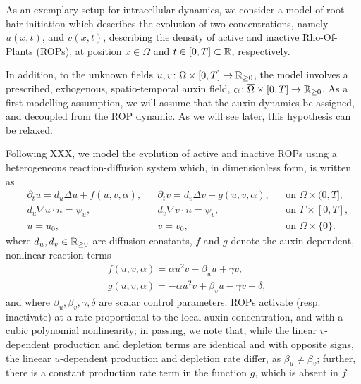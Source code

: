 \documentclass[a4paper]{siamonline220329}
\begin{document}
As an exemplary setup for intracellular dynamics, we consider a model of root-hair
initiation which describes the evolution of two concentrations, namely $u(x,t)$, and
$v(x,t)$, describing the density of active and inactive Rho-Of-Plants (ROPs), at
position $x \in \Omega$ and $t \in [0,T] \subset \mathbb{R}$, respectively.  

In addition, to the unknown fields $u,v \colon \overline{\Omega} \times [0,T] \to
\mathbb{R}_{ \geq  0}$, the model involves a prescribed, exhogenous, spatio-temporal auxin
field, $\alpha \colon \overline{\Omega} \times [0,T] \to \mathbb{R}_{ \geq  0}$. As a
first modelling assumption, we will assume that the auxin dynamics be assigned, and
decoupled from the ROP dynamic. As we will see later, this hypothesis can be relaxed.

Following XXX, we model the evolution of active and inactive ROPs using a
heterogeneous reaction-diffusion system which, in dimensionless form, is written
as
  \begin{align}
    & \partial_t u = d_u \Delta u + f(u,v,\alpha), 
      && \partial_t v = d_v \Delta v + g(u,v,\alpha), 
      && \text{on $\Omega\times (0,T]$,} \label{eq:RDEs}\\
    & d_u \nabla u \cdot n = \psi_u, 
      && d_v \nabla v \cdot n = \psi_v, 
      && \text{on $\Gamma \times [0,T]$,} \label{eq:BCs}\\
    & u = u_0,  && v = v_0, && \text{on $\Omega \times \{0\}$.} \label{eq:ICs}
  \end{align}
where $d_u, d_v \in \mathbb{R}_{ \geq 0}$ are diffusion constants, $f$ and $g$  denote the auxin-dependent, nonlinear
reaction terms
\[
  \begin{aligned}
   & f(u,v,\alpha) = \alpha u^2 v - \beta_u u + \gamma v, \\
   & g(u,v,\alpha) = -\alpha u^2 v + \beta_v u - \gamma v + \delta,
  \end{aligned}
\]
and where $\beta_u, \beta_v, \gamma, \delta$ are scalar control parameters. ROPs
activate (resp. inactivate) at a rate proportional to the local auxin concentration,
and with a cubic polynomial nonlinearity; in passing, we note that, while the
linear $v$-dependent production and depletion terms are identical and with opposite signs,
the lineear $u$-dependent production and depletion rate differ, as $\beta_u \neq
\beta_v$; further, there is a constant production rate term in the function $g$,
which is absent in $f$. 
\end{document}
